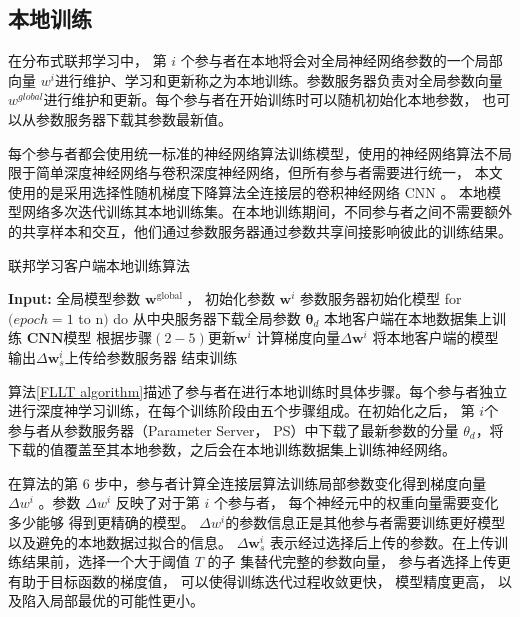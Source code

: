 \subsection{本地训练}
在分布式联邦学习中， 第 $i$ 个参与者在本地将会对全局神经网络参数的一个局部向量 $w^{i}$进行维护、学习和更新称之为本地训练。参数服务器负责对全局参数向量 $w^{g l o b a l}$进行维护和更新。每个参与者在开始训练时可以随机初始化本地参数， 也可以从参数服务器下载其参数最新值。

每个参与者都会使用统一标准的神经网络算法训练模型，使用的神经网络算法不局限于简单深度神经网络与卷积深度神经网络，但所有参与者需要进行统一， 本文使用的是采用选择性随机梯度下降算法全连接层的卷积神经网络 $\mathrm{CNN}$ 。 本地模型网络多次迭代训练其本地训练集。在本地训练期间，不同参与者之间不需要额外的共享样本和交互，他们通过参数服务器通过参数共享间接影响彼此的训练结果。

\begin{algorithm}[!htb]
	\caption{联邦学习客户端本地训练算法}
	\label{FLLT algorithm}
	\begin{algorithmic}[1]
		\footnotesize
		\STATE \textbf{Input:} 全局模型参数 $\boldsymbol{w}^{\text {global }}$， 初始化参数 $\boldsymbol{w}^{i}$
	    \STATE 参数服务器初始化模型
	    \STATE for $(epoch=1$ to $\mathrm{n})$ do
	    \STATE 从中央服务器下载全局参数 $\boldsymbol{\theta}_{d}$
	    \STATE 本地客户端在本地数据集上训练 $\boldsymbol{CNN}$模型
	    \STATE 根据步骤$(2-5)$更新$\boldsymbol{w}^{i}$ 
	    \STATE 计算梯度向量$\Delta \boldsymbol{w}^{i}$
		\STATE 将本地客户端的模型输出$\Delta \boldsymbol{w}_{s}^{i}$上传给参数服务器
		\STATE 结束训练
	\end{algorithmic}
\end{algorithm}

算法\ref{FLLT algorithm}描述了参与者在进行本地训练时具体步骤。每个参与者独立进行深度神学习训练，在每个训练阶段由五个步骤组成。在初始化之后， 第 $i$个参与者从参数服务器（Parameter Server， PS）中下载了最新参数的分量 $\theta_{d}$，将下载的值覆盖至其本地参数，之后会在本地训练数据集上训练神经网络。

在算法的第 6 步中，参与者计算全连接层算法训练局部参数变化得到梯度向量 $\Delta w^{i}$ 。参数 $\Delta w^{i}$ 反映了对于第 $i$ 个参与者， 每个神经元中的权重向量需要变化多少能够 得到更精确的模型。 $\Delta w^{i}$的参数信息正是其他参与者需要训练更好模型以及避免的本地数据过拟合的信息。
$\Delta \boldsymbol{w}_{s}^{i}$ 表示经过选择后上传的参数。在上传训练结果前，选择一个大于阈值 $T$ 的子 集替代完整的参数向量， 参与者选择上传更有助于目标函数的梯度值， 可以使得训练迭代过程收敛更快， 模型精度更高， 以及陷入局部最优的可能性更小。

